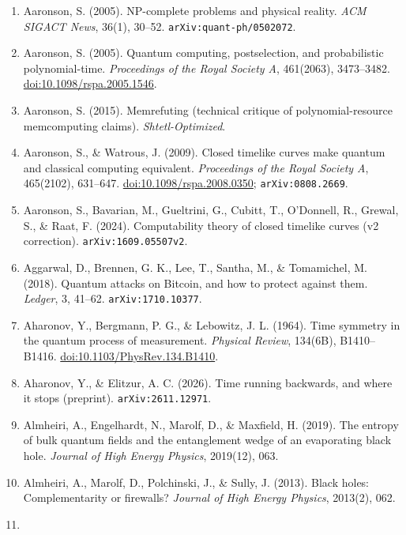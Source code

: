 \documentclass[10pt,letterpaper]{article}
\providecommand{\tightlist}{\setlength{\itemsep}{1pt}\setlength{\parskip}{0pt}}
\begin{document}
\begin{enumerate}
\def\labelenumi{\arabic{enumi}.}
\tightlist
\item
  Aaronson, S. (2005). NP-complete problems and physical reality.
  \emph{ACM SIGACT News}, 36(1), 30--52.
  \texttt{arXiv:quant-\allowbreak{}ph/\allowbreak{}0502072}.
\item
  Aaronson, S. (2005). Quantum computing, postselection, and
  probabilistic polynomial-time. \emph{Proceedings of the Royal Society
  A}, 461(2063), 3473--3482.
  \href{https://doi.org/10.1098/rspa.2005.1546}{doi:10.1098/rspa.2005.1546}.
\item
  Aaronson, S. (2015). Memrefuting (technical critique of
  polynomial-resource memcomputing claims). \emph{Shtetl-Optimized}.
\item
  Aaronson, S., \& Watrous, J. (2009). Closed timelike curves make
  quantum and classical computing equivalent. \emph{Proceedings of the
  Royal Society A}, 465(2102), 631--647.
  \href{https://doi.org/10.1098/rspa.2008.0350}{doi:10.1098/rspa.2008.0350};
  \texttt{arXiv:0808.\allowbreak{}2669}.
\item
  Aaronson, S., Bavarian, M., Gueltrini, G., Cubitt, T., O'Donnell, R.,
  Grewal, S., \& Raat, F. (2024). Computability theory of closed
  timelike curves (v2 correction). \texttt{arXiv:1609.\allowbreak{}05507v2}.
\item
  Aggarwal, D., Brennen, G. K., Lee, T., Santha, M., \& Tomamichel, M.
  (2018). Quantum attacks on Bitcoin, and how to protect against them.
  \emph{Ledger}, 3, 41--62. \texttt{arXiv:1710.\allowbreak{}10377}.
\item
  Aharonov, Y., Bergmann, P. G., \& Lebowitz, J. L. (1964). Time
  symmetry in the quantum process of measurement. \emph{Physical
  Review}, 134(6B), B1410--B1416.
  \href{https://doi.org/10.1103/PhysRev.134.B1410}{doi:10.1103/PhysRev.134.B1410}.
\item
  Aharonov, Y., \& Elitzur, A. C. (2026). Time running backwards, and
  where it stops (preprint). \texttt{arXiv:2611.\allowbreak{}12971}.
\item
  Almheiri, A., Engelhardt, N., Marolf, D., \& Maxfield, H. (2019). The
  entropy of bulk quantum fields and the entanglement wedge of an
  evaporating black hole. \emph{Journal of High Energy Physics},
  2019(12), 063.
\item
  Almheiri, A., Marolf, D., Polchinski, J., \& Sully, J. (2013). Black
  holes: Complementarity or firewalls? \emph{Journal of High Energy
  Physics}, 2013(2), 062.
\item

\end{enumerate}
\end{document}
